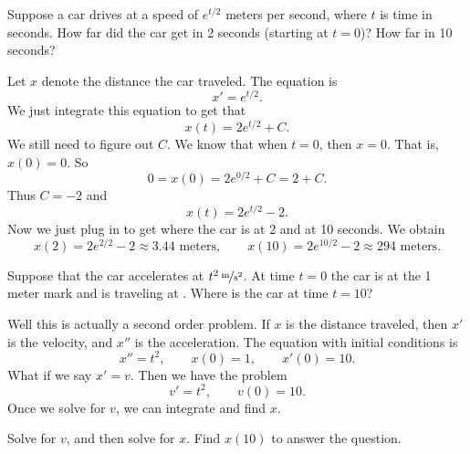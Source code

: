 \begin{example}
Suppose a car drives at a speed of $e^{t/2}$ meters per second,
where $t$ is time in seconds.
How far did the car get in 2 seconds (starting at $t=0$)?  How far in 10 seconds?

Let $x$ denote the distance the car traveled.
The equation is
\begin{equation*}
x' = e^{t/2} .
\end{equation*}
We just integrate this equation to get that
\begin{equation*}
x(t) = 2 e^{t/2} + C . 
\end{equation*}
We still need to figure out $C$.  We know that when $t=0$, then
$x=0$.  That is, $x(0) = 0$.  So
\begin{equation*}
0 = x(0) = 2e^{0/2} + C = 2 + C .
\end{equation*}
Thus $C = -2$ and 
\begin{equation*}
x(t) = 2 e^{t/2} - 2 .
\end{equation*}
Now we just plug in to get where the car is at 2 and at 10 seconds.
We obtain
\begin{equation*}
x(2) = 2e^{2/2} - 2 \approx 3.44 \text{ meters} ,
\qquad
x(10) = 2e^{10/2} - 2 \approx 294 \text{ meters} .
\end{equation*}
\end{example}

\begin{example}
Suppose that the car accelerates at $\unitfrac[t^2]{m}{s^2}$.
At time $t=0$ the car is at the 1 meter mark and is traveling at
.  Where is the car at time $t=10$?

Well this is actually a second order problem.  If $x$ is the distance
traveled, then $x'$ is the velocity, and $x''$ is the acceleration.
The equation with initial conditions is
\begin{equation*}
x'' = t^2 , \qquad x(0) = 1 , \qquad x'(0) = 10 .
\end{equation*}
What if we say $x' = v$.  Then we have the problem
\begin{equation*}
v' = t^2, \qquad v(0) = 10 .
\end{equation*}
Once we solve for $v$, we can integrate and find $x$.
\end{example}

\begin{exercise}
Solve for $v$, and then solve for $x$.  Find $x(10)$ to answer the
question.
\end{exercise}

